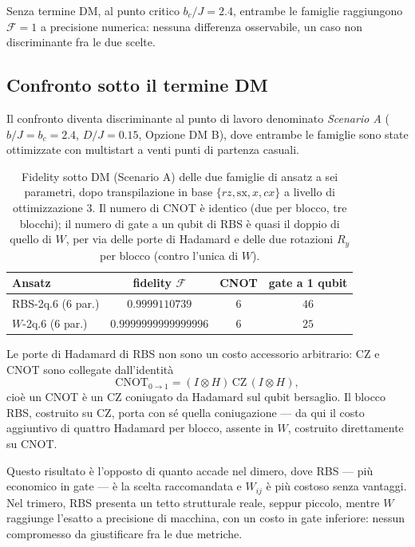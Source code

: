\documentclass[11pt,a4paper]{article}
\begin{document}
Senza termine DM, al punto critico $b_c/J=2.4$, entrambe le famiglie
raggiungono $\mathcal F=1$ a precisione numerica: nessuna differenza
osservabile, un caso non discriminante fra le due scelte.

\subsection{Confronto sotto il termine DM}
\label{sec:rbs-vs-w}

Il confronto diventa discriminante al punto di lavoro denominato
\emph{Scenario A} ($b/J=b_c=2.4$, $D/J=0.15$, Opzione DM B), dove entrambe
le famiglie sono state ottimizzate con multistart a venti punti di
partenza casuali.

\begin{table}[htbp]
\centering
\small
\renewcommand{\arraystretch}{1.3}
\begin{tabular}{@{}lccc@{}}
\toprule
\rowcolor{grigetto}
\textbf{Ansatz} & \textbf{fidelity} $\mathcal F$ & \textbf{CNOT} & \textbf{gate a 1 qubit} \\
\midrule
RBS-2q.6 (6 par.) & $0.9999110739$ & $6$ & $46$ \\
$W$-2q.6 (6 par.) & $0.9999999999999996$ & $6$ & $25$ \\
\bottomrule
\end{tabular}
\caption{Fidelity sotto DM (Scenario A) delle due famiglie di ansatz a
sei parametri, dopo transpilazione in base $\{rz,\mathrm{sx},x,cx\}$ a
livello di ottimizzazione 3. Il numero di CNOT è identico (due per
blocco, tre blocchi); il numero di gate a un qubit di RBS è quasi il
doppio di quello di $W$, per via delle porte di Hadamard e delle due
rotazioni $R_y$ per blocco (contro l'unica di $W$).}
\label{tab:rbs-vs-w}
\end{table}
\FloatBarrier

Le porte di Hadamard di RBS non sono un costo accessorio arbitrario: CZ
e CNOT sono collegate dall'identità
\begin{equation}
\text{CNOT}_{0\to1} = (I\otimes H)\,\text{CZ}\,(I\otimes H),
\end{equation}
cioè un CNOT è un CZ coniugato da Hadamard sul qubit bersaglio. Il
blocco RBS, costruito su CZ, porta con sé quella coniugazione --- da
qui il costo aggiuntivo di quattro Hadamard per blocco, assente in
$W$, costruito direttamente su CNOT.

Questo risultato è l'opposto di quanto accade nel dimero, dove RBS ---
più economico in gate --- è la scelta raccomandata e $W_{ij}$ è più
costoso senza vantaggi. Nel trimero, RBS presenta un tetto strutturale
reale, seppur piccolo, mentre $W$ raggiunge l'esatto a precisione di
macchina, con un costo in gate inferiore: nessun compromesso da
giustificare fra le due metriche.
\end{document}
